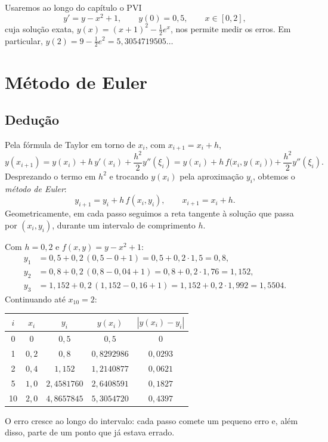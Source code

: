 Usaremos ao longo do capítulo o PVI
\[
y'=y-x^2+1,\qquad y(0)=0{,}5,\qquad x\in[0,2],
\]
cuja solução exata, $y(x)=(x+1)^2-\tfrac12e^x$, nos permite medir os erros. Em particular,
$y(2)=9-\tfrac12e^2=5{,}3054719505\dots$

\section{Método de Euler}

\subsection{Dedução}

Pela fórmula de Taylor em torno de $x_i$, com $x_{i+1}=x_i+h$,
\[
y(x_{i+1})=y(x_i)+h\,y'(x_i)+\frac{h^2}{2}y''(\xi_i)
=y(x_i)+h\,f\bigl(x_i,y(x_i)\bigr)+\frac{h^2}{2}y''(\xi_i).
\]
Desprezando o termo em $h^2$ e trocando $y(x_i)$ pela aproximação $y_i$, obtemos o
\emph{método de Euler}:
\[
\boxed{\;y_{i+1}=y_i+h\,f(x_i,y_i),\qquad x_{i+1}=x_i+h.\;}
\]
Geometricamente, em cada passo seguimos a reta tangente à solução que passa por
$(x_i,y_i)$, durante um intervalo de comprimento $h$.

\begin{exemplo}
Com $h=0{,}2$ e $f(x,y)=y-x^2+1$:
\begin{align*}
y_1&=0{,}5+0{,}2\,(0{,}5-0+1)=0{,}5+0{,}2\cdot1{,}5=0{,}8,\\
y_2&=0{,}8+0{,}2\,(0{,}8-0{,}04+1)=0{,}8+0{,}2\cdot1{,}76=1{,}152,\\
y_3&=1{,}152+0{,}2\,(1{,}152-0{,}16+1)=1{,}152+0{,}2\cdot1{,}992=1{,}5504.
\end{align*}
Continuando até $x_{10}=2$:
\begin{center}
\renewcommand{\arraystretch}{1.25}
\begin{tabular}{c|c|c|c|c}
$i$ & $x_i$ & $y_i$ & $y(x_i)$ & $|y(x_i)-y_i|$\\ \hline
0 & 0 & $0{,}5$ & $0{,}5$ & 0\\
1 & $0{,}2$ & $0{,}8$ & $0{,}8292986$ & $0{,}0293$\\
2 & $0{,}4$ & $1{,}152$ & $1{,}2140877$ & $0{,}0621$\\
5 & $1{,}0$ & $2{,}4581760$ & $2{,}6408591$ & $0{,}1827$\\
10 & $2{,}0$ & $4{,}8657845$ & $5{,}3054720$ & $0{,}4397$
\end{tabular}
\end{center}
O erro cresce ao longo do intervalo: cada passo comete um pequeno erro e, além disso, parte
de um ponto que já estava errado.
\end{exemplo}

